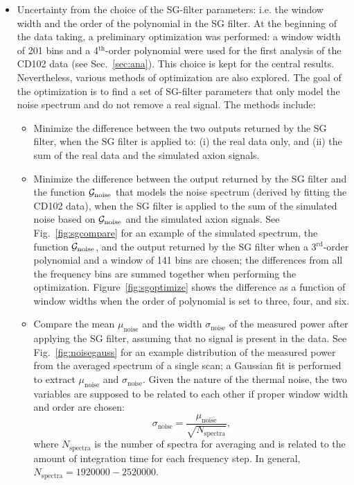 \begin{itemize}
\item Uncertainty from the choice of the SG-filter parameters: i.e.  
the window width and the order of the polynomial in the SG filter. At the 
beginning of the data taking, a preliminary optimization was performed: a 
window width of 201 bins and a 4$^\text{th}$-order polynomial were used for 
the first analysis of the CD102 data (see Sec.~\ref{sec:ana}). 
This choice is kept for the central results. 
Nevertheless, various methods of optimization are also explored. The goal 
of the optimization is to find a set of SG-filter parameters that only 
model the noise spectrum and do not remove a real signal. 
The methods include:
\begin{itemize}
 \item Minimize the difference between the two outputs returned by the SG 
filter, when the SG filter is applied to: (i) the real data only, and (ii) 
the sum of the real data and the simulated axion signals. 
 \item Minimize the difference between the output returned by the 
 SG filter and the function ${\cal G}_\text{noise}$ 
that models the noise spectrum (derived by fitting the CD102 data), 
when the SG filter is applied to the sum of the simulated noise based on 
${\cal G}_\text{noise}$ and the simulated axion signals. 
See Fig.~\ref{fig:sgcompare} for an example of the 
simulated spectrum, the function ${\cal G}_\text{noise}$, and the 
output returned by 
 the SG filter when a 3$^\text{rd}$-order polynomial and a window of 141 
 bins are chosen; the differences from all the frequency bins are summed 
 together when performing the optimization.
 Figure~\ref{fig:sgoptimize} shows the difference 
as a function of window widths when the order of polynomial is 
 set to three, four, and six. 
 \item Compare the mean $\mu_\text{noise}$ and the width $\sigma_\text{noise}$ 
of the measured power after applying the SG filter, 
assuming that no signal is present in the 
data. See Fig.~\ref{fig:noisegauss} for an example distribution 
of the measured power from the averaged spectrum of a 
single scan; %
a Gaussian fit is performed to extract 
$\mu_\text{noise}$ and $\sigma_\text{noise}$. Given the nature of the 
thermal noise, the two variables are supposed to be related to 
each other if proper window width and order are chosen:
\begin{equation*} 
\sigma_\text{noise} = \frac{\mu_\text{noise}}{\sqrt{N_\text{spectra}}},
\end{equation*}
where $N_\text{spectra}$ is the number of spectra for averaging and 
is related to the amount of integration time for each frequency step. In 
general, $N_\text{spectra}=1920000-2520000$. 
\end{itemize}


\end{itemize}
